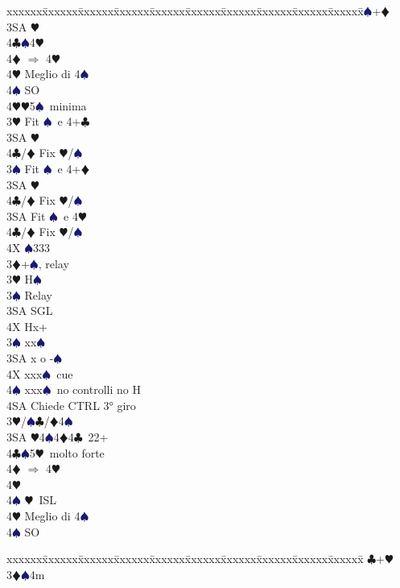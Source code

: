 \documentclass[a4paper,italian]{article}
\newcommand{\BC}{\textcolor{OliveGreen}{$\clubsuit$}}
\newcommand{\BD}{\textcolor{RedOrange}{$\vardiamondsuit$}}
\newcommand{\BH}{\textcolor{Red2}{$\varheartsuit${}}}
\newcommand{\BS}{\textcolor{MidnightBlue}{$\spadesuit${}}}
\newenvironment{bidtable}
{\begin{tabbing}

    xxxxxx\=xxxxxx\=xxxxxx\=xxxxxx\=xxxxxx\=xxxxxx\=xxxxxx\=xxxxxx\=xxxxxx\=xxxxxx\=\kill}
{\end{tabbing} }%
\begin{document}
\begin{multicols}{2}
\begin{bidtable}
        3\BS {}+\BD \\
        3SA \BH \\
        4\BC {}\BS 4\BH\+\\
        4\BD \> $\Rightarrow$ 4\BH\\
        4\BH \> Meglio di 4\BS\\
        4\BS \> SO\-\\
        4\BH {}\BH 5\BS\ minima\-\\
        3\BH \> Fit \BS\ e 4+\BC \+\\
        3SA \BH \+\\
        4\BC/\BD \> Fix \BH/\BS\-\-\\
        3\BS \> Fit \BS\ e 4+\BD \+\\
        3SA \BH \+\\
        4\BC/\BD \> Fix \BH/\BS\-\-\\
        3SA \> Fit \BS\ e 4\BH \+\\
        4\BC/\BD \> Fix \BH/\BS\-\\
        4X \BS 333\-\\
        3\BD {}+\BS , relay\+\\
        3\BH \> H\BS \+\\
        3\BS \> Relay\+\\
        3SA \> SGL\\
        4X \> Hx+\-\-\\
        3\BS \> xx\BS \\
        3SA \> x o -\BS \\
        4X \> xxx\BS\ cue\\
        4\BS \> xxx\BS\ no controlli no H\+\\
        4SA \> Chiede CTRL 3° giro\-\-\\
        3\BH/\BS {}\BC /\BD 4\BS \\
        3SA \BH 4\BS 4\BD 4\BC\ 22+\\
        4\BC {}\BS 5\BH\ molto forte\+\\
        4\BD \> $\Rightarrow$ 4\BH \+\\
        4\BH\+\\
        4\BS \> \BH\ ISL\-\-\\
        4\BH \> Meglio di 4\BS \\
        4\BS \> SO
    \end{bidtable}
    \begin{bidtable}
        \>\BC {}+\BH \+\+\+\\
        3\BD {}\BS 4m\+\\

\end{bidtable}
\end{multicols}
\end{document}
